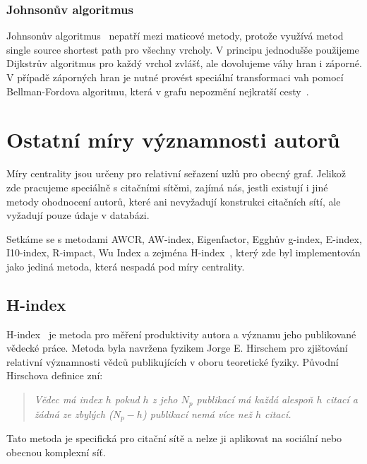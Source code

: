 \documentclass{bakalarka}
\begin{document}
\subsubsection{Johnsonův algoritmus}
Johnsonův algoritmus~\citep{johnson1977} nepatří mezi maticové metody, protože
využívá metod single source shortest path pro všechny vrcholy. V principu
jednodušše použijeme Dijkstrův algoritmus pro každý vrchol zvlášť, ale
dovolujeme váhy hran i záporné. V případě záporných hran je nutné provést
speciální transformaci vah pomocí Bellman-Fordova algoritmu, která v grafu
nepozmění nejkratší cesty~\citep{CLRS}.


\section{Ostatní míry významnosti autorů}
Míry centrality jsou určeny pro relativní seřazení uzlů pro obecný graf.
Jelikož zde pracujeme speciálně s citačními sítěmi, zajímá nás, jestli existují
i jiné metody ohodnocení autorů, které ani nevyžadují konstrukci citačních
sítí, ale vyžadují pouze údaje v databázi.

Setkáme se s metodami AWCR, AW-index, Eigenfactor, Egghův g-index, E-index,
I10-index, R-impact, Wu Index a zejména H-index~\citep{hlwikiaim}, který zde
byl implementován jako jediná metoda, která nespadá pod míry centrality.

\subsection{H-index}
H-index~\citep{hirsch2005} je metoda pro měření produktivity autora a významu
jeho publikované vědecké práce. Metoda byla navržena fyzikem Jorge E. Hirschem
pro zjištování relativní významnosti vědců publikujících v oboru teoretické
fyziky. Původní Hirschova definice zní:

\begin{quote}\textit{
Vědec má index $h$ pokud $h$ z jeho $N_p$ publikací má každá alespoň $h$ citací
a žádná ze zbylých ($N_p - h$) publikací nemá více než $h$ citací.
}
\end{quote}

Tato metoda je specifická pro citační sítě a nelze ji aplikovat na sociální
nebo obecnou komplexní síť.
\end{document}
